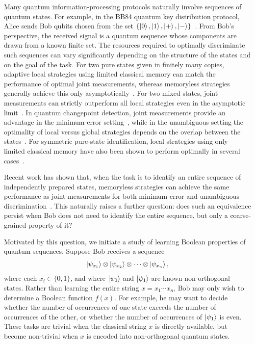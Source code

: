 Many quantum information-processing protocols naturally involve sequences of quantum states. 
For example, in the BB84 quantum key distribution protocol, Alice sends Bob qubits chosen from the set $\{\ket{0}, \ket{1}, \ket{+}, \ket{-}\}$~\cite{bennett2014quantum}. 
From Bob's perspective, the received signal is a quantum sequence whose components are drawn from a known finite set. 
The resources required to optimally discriminate such sequences can vary significantly depending on the structure of the states and on the goal of the task. 
For two pure states given in finitely many copies, adaptive local strategies using limited classical memory can match the performance of optimal joint measurements, whereas memoryless strategies generally achieve this only asymptotically~\cite{acin2005multiple}. 
For two mixed states, joint measurements can strictly outperform all local strategies even in the asymptotic limit~\cite{calsamiglia2010local}. 
In quantum changepoint detection, joint measurements provide an advantage in the minimum-error setting~\cite{sentis2016quantum}, while in the unambiguous setting the optimality of local versus global strategies depends on the overlap between the states~\cite{sentis2017exact}. 
For symmetric pure-state identification, local strategies using only limited classical memory have also been shown to perform optimally in several cases~\cite{sentis2022online}.

Recent work has shown that, when the task is to identify an entire sequence of independently prepared states, memoryless strategies can achieve the same performance as joint measurements for both minimum-error and unambiguous discrimination~\cite{gupta2024unambiguous,gupta2024optimal}. 
This naturally raises a further question: does such an equivalence persist when Bob does not need to identify the entire sequence, but only a coarse-grained property of it?

Motivated by this question, we initiate a study of learning Boolean properties of quantum sequences. 
Suppose Bob receives a sequence
\begin{equation*}
    \ket{\psi_{x_1}} \otimes \ket{\psi_{x_2}} \otimes \cdots \otimes \ket{\psi_{x_n}},
\end{equation*}
where each $x_i \in \{0, 1\}$, and where $\ket{\psi_0}$ and $\ket{\psi_1}$ are known non-orthogonal states. 
Rather than learning the entire string $x = x_1 \cdots x_n$, Bob may only wish to determine a Boolean function $f(x)$. 
For example, he may want to decide whether the number of occurrences of one state exceeds the number of occurrences of the other, or whether the number of occurrences of $\ket{\psi_1}$ is even. 
These tasks are trivial when the classical string $x$ is directly available, but become non-trivial when $x$ is encoded into non-orthogonal quantum states.

